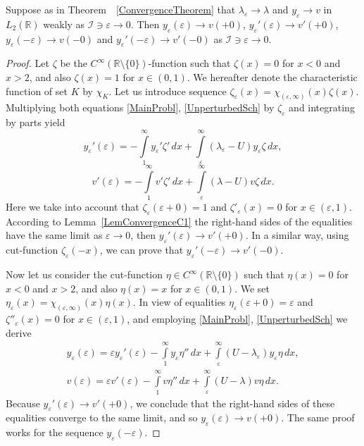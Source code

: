\documentclass[11pt,english]{amsart}%
\begin{document}
\begin{g_lemma}\label{LemmmaYe(eps)}
Suppose as in Theorem~~\ref{ConvergenceTheorem} that $\lambda_\varepsilon\to \lambda$ and $y_\varepsilon \to v$ in $L_2(\mathbb{R})$ weakly as $\mathcal{I}\ni \varepsilon\to 0$.
Then $y_\varepsilon(\varepsilon)\to v(+0)$, $y_\varepsilon'(\varepsilon)\to v'(+0)$, $y_\varepsilon(-\varepsilon)\to v(-0)$ and $y_\varepsilon'(-\varepsilon)\to v'(-0)$ as $\mathcal{I}\ni \varepsilon\to 0$.
\end{g_lemma}
\begin{proof}
Let $\zeta$ be the $C^\infty(\mathbb{R}\setminus \{0\})$-function such that $\zeta(x)=0$ for $x<0$ and $x> 2$, and also $\zeta(x)=1$ for $x\in (0,1)$. We hereafter denote the characteristic function of set $K$ by $\chi_K$. Let us introduce  sequence   $\zeta_\varepsilon(x)=\chi_{(\varepsilon,\infty)}(x)\zeta(x)$. Multiplying both equations \eqref{MainProbl}, \eqref{UnperturbedSch} by $\zeta_\varepsilon$ and integrating by parts yield
$$
y_\varepsilon'(\varepsilon)=-\int\limits^{\infty}_1y_\varepsilon'\zeta'\,dx+
\int\limits^{\infty}_\varepsilon(\lambda_\varepsilon-U)y_\varepsilon\zeta\,dx,
$$
$$
v'(\varepsilon)=-\int\limits^{\infty}_1v'\zeta'\,dx+
\int\limits^{\infty}_\varepsilon(\lambda-U)v\zeta\,dx.
$$
Here we take into account that $\zeta_\varepsilon(\varepsilon+0)=1$ and $\zeta'_\varepsilon(x)=0$ for $x\in (\varepsilon,1)$. According to Lemma~\ref{LemConvergenceC1}
the right-hand sides of the equalities have the same limit as $\varepsilon\to 0$, then $y_\varepsilon'(\varepsilon)\to v'(+0)$.
In a similar way, using  cut-function $\zeta_\varepsilon(-x)$, we can prove that $y_\varepsilon'(-\varepsilon)\to v'(-0)$.

Now let us consider the cut-function $\eta\in C^\infty(\mathbb{R}\setminus \{0\})$ such that $\eta(x)=0$ for $x<0$ and $x>2$, and also $\eta(x)=x$ for $x\in (0,1)$. We set $\eta_\varepsilon(x)=\chi_{(\varepsilon,\infty)}(x)\eta(x)$. In view of equalities $\eta_\varepsilon(\varepsilon+0)=\varepsilon$ and $\zeta''_\varepsilon(x)=0$ for $x\in (\varepsilon,1)$, and employing  \eqref{MainProbl}, \eqref{UnperturbedSch} we derive
\begin{gather*}
y_\varepsilon(\varepsilon)=\varepsilon y_\varepsilon'(\varepsilon)
-\int\limits^{\infty}_1y_\varepsilon\eta''\,dx+
\int\limits^{\infty}_\varepsilon(U-\lambda_\varepsilon)y_\varepsilon\eta\,dx,\\[5pt]
v(\varepsilon)=\varepsilon v'(\varepsilon)-\int\limits^{\infty}_1v\eta''\,dx+
\int\limits^{\infty}_\varepsilon(U-\lambda)v\eta\,dx.
\end{gather*}
Because $y_\varepsilon'(\varepsilon)\to v'(+0)$, we conclude that  the right-hand sides of these equalities converge to the same limit, and so $y_\varepsilon(\varepsilon)\to v(+0)$.
The same proof works for the sequence $y_\varepsilon(-\varepsilon)$.
\end{proof}
\end{document}
